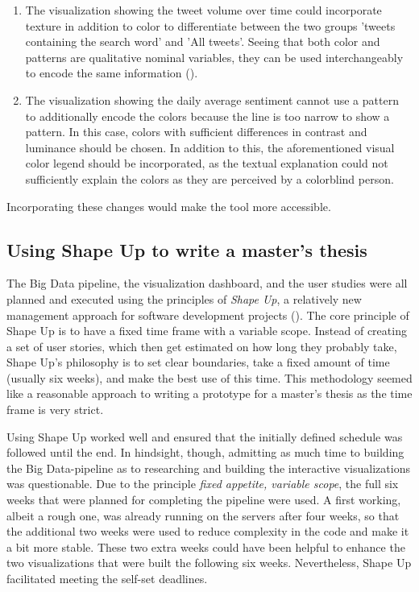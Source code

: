 \begin{enumerate}
    \item The visualization showing the tweet volume over time could incorporate texture in addition to color to differentiate between the two groups 'tweets containing the search word' and 'All tweets'. Seeing that both color and patterns are qualitative nominal variables, they can be used interchangeably to encode the same information (\cite{bornerDataVisualizationLiteracy2019}). %
    \item The visualization showing the daily average sentiment cannot use a pattern to additionally encode the colors because the line is too narrow to show a pattern. In this case, colors with sufficient differences in contrast and luminance should be chosen. In addition to this, the aforementioned visual color legend should be incorporated, as the textual explanation could not sufficiently explain the colors as they are perceived by a colorblind person.
\end{enumerate}

Incorporating these changes would make the tool more accessible.

\subsection*{Using Shape Up to write a master's thesis} \label{sec:shape_up}
The Big Data pipeline, the visualization dashboard, and the user studies were all planned and executed using the principles of \emph{Shape Up}, a relatively new management approach for software development projects (\cite{singerShapeStopRunning2019}). The core principle of Shape Up is to have a fixed time frame with a variable scope. Instead of creating a set of user stories, which then get estimated on how long they probably take, Shape Up's philosophy is to set clear boundaries, take a fixed amount of time (usually six weeks), and make the best use of this time. This methodology seemed like a reasonable approach to writing a prototype for a master's thesis as the time frame is very strict.

Using Shape Up worked well and ensured that the initially defined schedule was followed until the end. In hindsight, though, admitting as much time to building the Big Data-pipeline as to researching and building the interactive visualizations was questionable. Due to the principle \emph{fixed appetite, variable scope}, the full six weeks that were planned for completing the pipeline were used. A first working, albeit a rough one, was already running on the   servers after four weeks, so that the additional two weeks were used to reduce complexity in the code and make it a bit more stable. These two extra weeks could have been helpful to enhance the two visualizations that were built the following six weeks. Nevertheless, Shape Up facilitated meeting the self-set deadlines.

